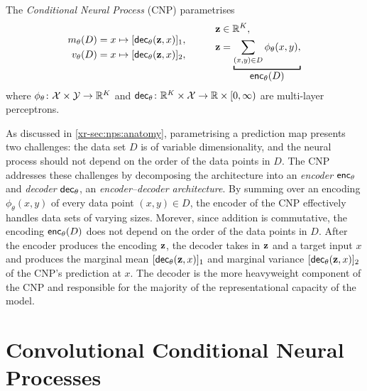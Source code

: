 \documentclass[12pt]{report}
\newcommand{\xrprefix}[1]{xr-#1}
\begin{document}
\begin{model}
    \label{mod:cnp}
    The \emph{Conditional Neural Process} (CNP) parametrises
    \begin{equation*}
        \begin{aligned}
            m_\theta(D) &= x \mapsto [\dec_\theta(\vz, x)]_1, \\
            v_\theta(D) &= x \mapsto [\dec_\theta(\vz, x)]_2, \\[1em]
        \end{aligned}
        \quad\qquad
        \begin{aligned}
            \vz &\in \R^K, \\
            \vz &= \underbracket[1pt]{
                \sum_{(x, y) \in D} \phi_\theta(x, y),
            }_{
                \displaystyle\enc_\theta(D)
            } \\
        \end{aligned}
    \end{equation*}
    where $\phi_\theta\colon \mathcal{X} \times \mathcal{Y} \to \mathbb{R}^K$ and  $\mathsf{dec}_\theta \colon \mathbb{R}^K \times \mathcal{X} \to \mathbb{R} \times [0, \infty)$ are multi-layer perceptrons.
\end{model}

As discussed in \cref{\xrprefix{sec:nps:anatomy}}, parametrising a prediction map presents two challenges:
the data set $D$ is of variable dimensionality,
and the neural process should not depend on the order of the data points in $D$.
The CNP addresses these challenges by decomposing the architecture into an \emph{encoder} $\mathsf{enc}_\theta$ and \emph{decoder} $\mathsf{dec}_\theta$, an \emph{encoder--decoder architecture}.
By summing over an encoding $\phi_\theta(x, y)$ of every data point $(x, y) \in D$, the encoder of the CNP effectively handles data sets of varying sizes.
Morever, since addition is commutative, the encoding $\mathsf{enc}_\theta(D)$ does not depend on the order of the data points in $D$.
After the encoder produces the encoding $\mathbf{z}$, the decoder takes in $\mathbf{z}$ and a target input $x$ and produces the marginal mean $[\mathsf{dec}_\theta(\mathbf{z},x)]_1$ and marginal variance $[\mathsf{dec}_\theta(\mathbf{z},x)]_2$ of the CNP's prediction at $x$.
The decoder is the more heavyweight component of the CNP and responsible for the majority of the representational capacity of the model.


\section{Convolutional Conditional Neural Processes}
\label{sec:convcnps:convcnps}
\end{document}
